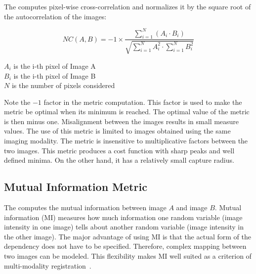 The  computes pixel-wise
cross-correlation and normalizes it by the square root of the autocorrelation
of the images:

\begin{equation}
NC(A,B) = -1 \times \frac{ \sum_{i=1}^N \left( A_i \cdot B_i \right) }
        { \sqrt { \sum_{i=1}^N A_i^2  \cdot \sum_{i=1}^N B_i^2 } }
\end{equation}
\begin{center}
$A_i$ is the i-th pixel of Image A\\
$B_i$ is the i-th pixel of Image B\\
$N$ is the number of pixels considered
\end{center}

Note the $-1$ factor in the metric computation. This factor is used to make the
metric be optimal when its minimum is reached.  The optimal value of the metric
is then minus one. Misalignment between the images results in small measure
values.  The use of this metric is limited to images obtained using the same
imaging modality.  The metric is insensitive to multiplicative factors between
the two images.  This metric produces a cost function with sharp peaks and well
defined minima.  On the other hand, it has a relatively small capture radius.


\subsection{Mutual Information Metric}
\label{sec:MutualInformationMetric}

The  computes the mutual
information between image $A$ and image $B$.  Mutual information (MI)
measures how much information one random variable (image intensity in one
image) tells about another random variable (image intensity in the other
image). The major advantage of using MI is that the actual form of the
dependency does not have to be specified.  Therefore, complex mapping between
two images can be modeled.  This flexibility makes MI well suited as a
criterion of multi-modality registration~\cite{Pluim2003}.


